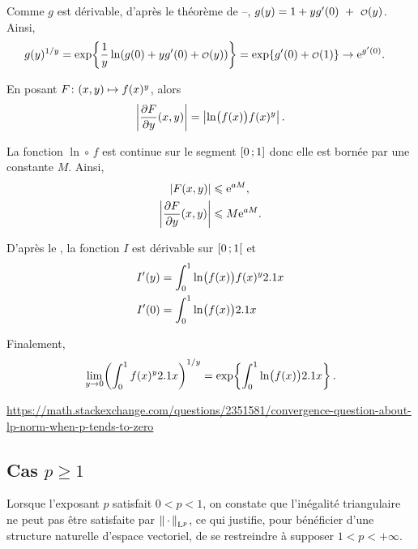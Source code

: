 \begin{solution}
\begin{reponses}
\item Comme $g$ est dérivable, d'après le théorème de --, $g(y) = 1 + y g'(0)~+~\petito(y)$. Ainsi,
\begin{align*}
g(y)^{1/y} &= \exp\mathopen{}\left\{\frac{1}{y} \ln(g(0) + y g'(0) + \petito(y))\right\}
= \exp\mathopen{}\left\{g'(0) + \petito(1)\right\}
\to \e^{g'(0)}.
\end{align*}

\item En posant $\fonctionligne[F]{(x, y)}{f(x)^y}$, alors
\[
\module{\frac{\partial F}{\partial y}(x, y)} = \module{\ln\mathopen{}\big(f(x)\big) f(x)^y}.
\]

La fonction $\ln \circ\, f$ est continue sur le segment $\interff{0}{1}$ donc elle est bornée par une constante $M$. Ainsi,
\begin{align*}
\module{F(x, y)} &\leqslant \e^{a M},\\
\module{\frac{\partial F}{\partial y}(x, y)} &\leqslant M \e^{a M}.
\end{align*}

D'après le , la fonction $I$ est dérivable sur $\interfo{0}{1}$ et
\begin{align*}
I'(y) &= \int_0^1 \ln\mathopen{}\big(f(x)\big) f(x)^y \d x \\
I'(0) &= \int_0^1 \ln\mathopen{}\big(f(x)\big) \d x
\end{align*}

\item Finalement,
\[
\lim_{y\to0} \mathopen{}\left(\int_0^1 f(x)^y \d x\right)^{1/y} = \exp\mathopen{}\left\{\int_0^1 \ln\mathopen{}\big(f(x)\big) \d x\right\}.
\]
\end{reponses}
\end{solution}

\url{https://math.stackexchange.com/questions/2351581/convergence-question-about-lp-norm-when-p-tends-to-zero}


\subsection{Cas $p \geqslant 1$}

Lorsque l'exposant $p$ satisfait $0 < p < 1$, on constate que l'inégalité triangulaire ne peut pas être satisfaite par $\norm{\,\cdot\,}_{\L^p}$, ce qui justifie, pour bénéficier d’une structure naturelle d’espace vectoriel, de se restreindre à supposer $1 < p < +\infty$.

